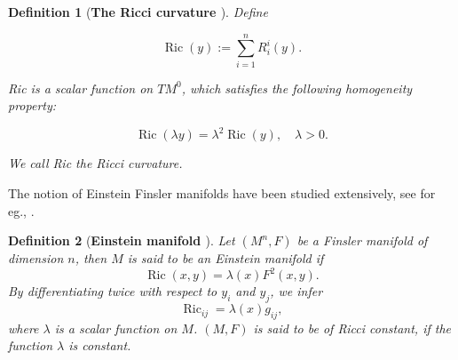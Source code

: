 \documentclass[pdflatex,sn-mathphys-num]{sn-jnl}%
\theoremstyle{thmstyleone}%
\theoremstyle{thmstyletwo}%
\theoremstyle{thmstylethree}%
\newtheorem{definition}{Definition}%
\begin{document}





\vspace{0.15in}	

\begin{definition}[\textbf{The Ricci curvature \cite[\boldmath p. $98$]{SSZ}}]
Define

$$
{\operatorname { R i c }}(y):=\sum_{i=1}^{n} R_{i}^{i}(y).
$$

  Ric is a scalar function on $TM^{0}$, which satisfies the following homogeneity property:

$$
{\operatorname { R i c }}(\lambda y)=\lambda^{2} 
{\operatorname { R i c }}(y), \quad \lambda>0 .
$$

We call Ric the Ricci curvature. 
\end{definition}

\vspace{0.15in}

The notion of Einstein  Finsler manifolds have been studied  extensively, see for eg., \cite{xz1}.

\vspace{0.15in}	

	\begin{definition} [\textbf{Einstein manifold \cite[\boldmath p. $118$]{SSZ}}] \label{Einstein}
		Let $(M^n,F)$ be a Finsler manifold of dimension $n$, then $M$ is said to be an {\it Einstein} manifold if  
                 $$\operatorname{Ric}(x,y)=\lambda(x) F^2 (x,y).$$
        By differentiating twice with respect to $y_i$ and $y_j$, we infer        
		\begin{equation}
			\operatorname{Ric}_{ij}=\lambda(x)g_{ij},
		\end{equation}
		where $\lambda$ is a scalar function on $M$.
$(M,F)$ is said to be of  Ricci constant, if the function  $\lambda$ is constant.  
	\end{definition}
 
\end{document}
